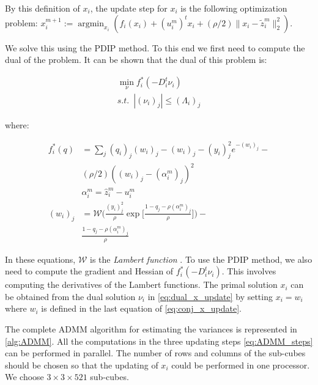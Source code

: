\documentclass[review]{elsarticle}
\DeclareMathOperator*{\argmin}{argmin}
\begin{document}
By this definition of $x_i$, the update step for $x_i$ is the following optimization problem: $x_i^{m+1}:=\argmin_{x_i} ( f_i(x_i) + (u_i^m)^t x_i + (\rho/2) \lVert x_i-\tilde{z}_i^m \lVert_2^2)$.

We solve this using the PDIP method. To this end we first need to compute the dual of the problem. It can be shown that the dual of this problem is:


\begin{equation}
\begin{aligned}
\min_\nu f_i^*(-D_i^t\nu_i) \\
s.t. \,\,\, | (\nu_i)_j | \le (\Lambda_i)_j
\end{aligned}
\label{eq:dual_x_update}
\end{equation}

\noindent where:

\begin{equation}
\begin{aligned}
f^*_i(q)&=\sum_j (q_i)_j (w_i)_j -(w_i)_j-(y_i)_j^2 e^{-(w_i)_j} - \\
& (\rho/2)((w_i)_j-(\alpha_i^m)_j)^2\\
&\alpha_i^m =\hat{z}_i^m-u_i^m\\
(w_i)_j&=\mathscr{W}\bigg(\frac{(y_i)_j^2}{\rho}\exp\bigg[\frac{1-q_j-\rho(\alpha_i^m)_j}{\rho}\bigg]\bigg)-\\
& \frac{1-q_j-\rho(\alpha_i^m)_j}{\rho}
\end{aligned}
\label{eq:conj_x_update}
\end{equation}

In these equations, $\mathscr{W}$ is the \textit{Lambert function} \cite{corless_lambertw_1996}. To use the PDIP method, we also need to compute the gradient and Hessian of $f_i^*(-D_i^t\nu_i)$. This involves computing the derivatives of the Lambert functions. The primal solution $x_i$ can be obtained from the dual solution $\nu_i$ in \ref{eq:dual_x_update} by setting $x_i=w_i$ where $w_i$ is defined in the last equation of \ref{eq:conj_x_update}. 

The complete ADMM algorithm for estimating the variances is represented in \ref{alg:ADMM}. All the computations in the three updating steps \ref{eq:ADMM_steps} can be performed in parallel. The number of rows and columns of the sub-cubes should be chosen so that the updating of $x_i$ could be performed in one processor. We choose $3\times3\times521$ sub-cubes.
\end{document}
